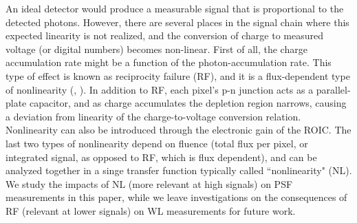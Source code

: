 \documentclass[11pt,preprint,flushrt]{aastex}
\begin{document}
An ideal detector would produce a measurable signal that is proportional to the detected photons. However, there are several places in the signal chain where this expected linearity is not realized, and the conversion of charge to measured voltage (or digital numbers) becomes non-linear. First of all, the charge accumulation rate might be a function of the photon-accumulation rate. This type of effect is known as reciprocity failure (RF), and it is a flux-dependent type of nonlinearity (\citealt{smith08}, \citealt{biesiadzinski11}). In addition to RF, each pixel's p-n junction acts as a parallel-plate capacitor, and as charge accumulates the depletion region narrows, causing a deviation from linearity of the charge-to-voltage conversion relation. Nonlinearity can also be introduced through the electronic gain of the ROIC. 
The last two types of nonlinearity depend on fluence (total flux per pixel, or integrated signal, as opposed to RF, which is flux dependent), and can be analyzed together in a singe transfer function typically called ``nonlinearity" (NL). We study the impacts of NL (more relevant at high signals) on PSF measurements in this paper, while we leave investigations on the consequences of RF (relevant at lower signals) on WL measurements for future work. 
\end{document}

